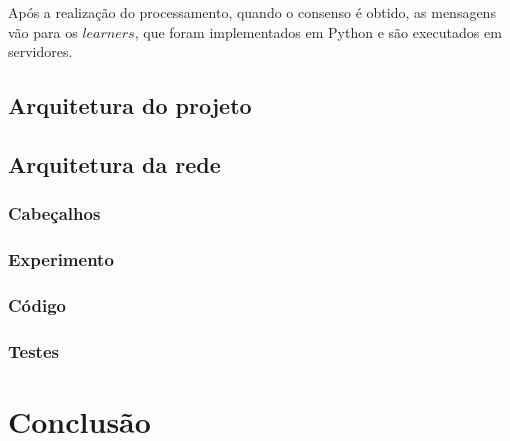 \documentclass[12pt,
openright, 
oneside,
a4paper,
brazil]{facom-ufu-abntex2}
\theoremstyle{definition}
\begin{document}


Após a realização do processamento, quando o consenso é obtido, as mensagens vão para os $learners$,
que foram implementados em Python e são executados em servidores.

\subsection{Arquitetura do projeto}
\subsection{Arquitetura da rede}
\subsubsection{Cabeçalhos}
\subsubsection{Experimento}
\subsubsection{Código}
\subsubsection{Testes}

\section{Conclusão}





\end{document}
